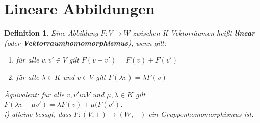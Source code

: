 \documentclass[12pt,a4paper]{article}
\theoremstyle{plain}
\newtheorem{Definition}[Theorem]{Definition}
\newcommand{\herv}[1]{{\emph{\textbf{#1}}}}
\numberwithin{equation}{section}
\begin{document}
\section{Lineare Abbildungen}
\begin{Definition}
Eine Abbildung $F: V \rightarrow W$ zwischen K-Vektorräumen heißt \herv{linear} (oder \herv{Vektorraumhomomorphismus}), wenn gilt:
\begin{enumerate}
\renewcommand{\labelenumi}{\emph{(\roman{enumi})}}
\item für alle $v,v'\in V$ gilt $F(v+v')=F(v)+F(v')$
\item für alle $\lambda \in K$ und $v\in V$ gilt $F(\lambda v)=\lambda F(v)$
\end{enumerate}
Äquivalent: für alle $v,v' in V$ und $\mu, \lambda\in K$ gilt $F(\lambda v+ \mu v')=\lambda F(v)+\mu (F(v')$.\\
\emph{i)} alleine besagt, dass $F: (V,+)\rightarrow (W,+)$ ein Gruppenhomomorphismus ist.
\end{Definition}
\end{document}
